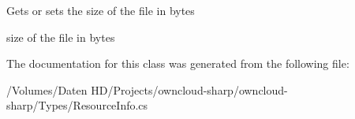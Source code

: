 Gets or sets the size of the file in bytes 

size of the file in bytes

The documentation for this class was generated from the following file\+:\begin{DoxyCompactItemize}
\item 
/\+Volumes/\+Daten H\+D/\+Projects/owncloud-\/sharp/owncloud-\/sharp/\+Types/Resource\+Info.\+cs\end{DoxyCompactItemize}
